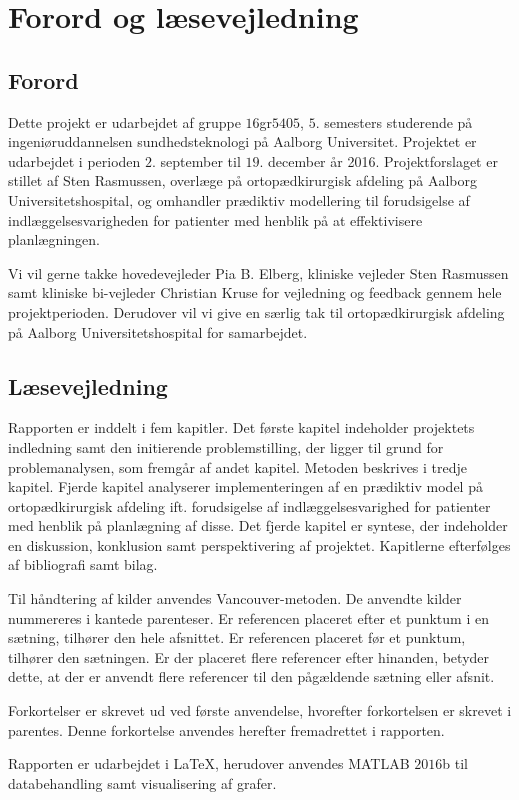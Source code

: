 \chapter*{Forord og læsevejledning}

\section*{Forord}
Dette projekt er udarbejdet af gruppe $16$gr$5405$, $5$. semesters studerende på ingeniøruddannelsen sundhedsteknologi på Aalborg Universitet. Projektet er udarbejdet i perioden $2$. september til $19$. december år 2016. Projektforslaget er stillet af Sten Rasmussen, overlæge på ortopædkirurgisk afdeling på Aalborg Universitetshospital, og omhandler prædiktiv modellering til forudsigelse af indlæggelsesvarigheden for patienter med henblik på at effektivisere planlægningen. 


Vi vil gerne takke hovedevejleder Pia B. Elberg, kliniske vejleder Sten Rasmussen samt kliniske bi-vejleder Christian Kruse for vejledning og feedback gennem hele projektperioden. Derudover vil vi give en særlig tak til ortopædkirurgisk afdeling på Aalborg Universitetshospital for samarbejdet. 


\section*{Læsevejledning}
Rapporten er inddelt i fem kapitler. Det første kapitel indeholder projektets indledning samt den initierende problemstilling, der ligger til grund for problemanalysen, som fremgår af andet kapitel. Metoden beskrives i tredje kapitel. Fjerde kapitel analyserer implementeringen af en prædiktiv model på ortopædkirurgisk afdeling ift. forudsigelse af indlæggelsesvarighed for patienter med henblik på planlægning af disse. Det fjerde kapitel er syntese, der indeholder en diskussion, konklusion samt perspektivering af projektet. Kapitlerne efterfølges af bibliografi samt bilag. 


Til håndtering af kilder anvendes Vancouver-metoden. De anvendte kilder nummereres i kantede parenteser. Er referencen placeret efter et punktum i en sætning, tilhører den hele afsnittet. Er referencen placeret før et punktum, tilhører den sætningen. Er der placeret flere referencer efter hinanden, betyder dette, at der er anvendt flere referencer til den pågældende sætning eller afsnit.

Forkortelser er skrevet ud ved første anvendelse, hvorefter forkortelsen er skrevet i parentes. Denne forkortelse anvendes herefter fremadrettet i rapporten. 


Rapporten er udarbejdet i \LaTeX, herudover anvendes MATLAB $2016$b til databehandling samt visualisering af grafer. 
